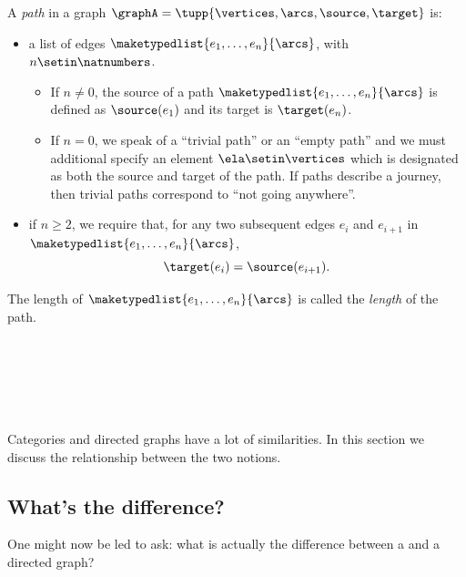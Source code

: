 \begin{ctdefinition}[Paths]
    \label{def:path}
    A \emph{path} in a graph $\graphA=\tupp{\vertices,\arcs, \source,\target}$ is:

    \constit

    \begin{itemize}
        \item a list of edges $\maketypedlist{e_1, \dots, e_n}{\arcs}$, with $n \setin \natnumbers$.
              \begin{itemize}
                  \item If $n \neq 0$, the source of a path $\maketypedlist{e_1, \dots, e_n}{\arcs}$ is defined as $\source(e_1)$ and its target is $\target(e_n)$.
                  \item If $n = 0$, we speak of a ``trivial path'' or an ``empty path'' and we must additional specify an element $\ela \setin \vertices$ which is designated as both the source and target of the path.
                        If paths describe a journey, then trivial paths correspond to ``not going anywhere''.
              \end{itemize}
    \end{itemize}

    \condit

    \begin{itemize}
        \item if $n \geq 2$, we require that, for any two subsequent edges $e_i$ and $e_{i+1}$ in $\maketypedlist{e_1, \dots, e_n}{\arcs}$,
              \begin{equation}
                  \target(e_i) = \source(e_{i+1}).
              \end{equation}
    \end{itemize}
    The length of $\maketypedlist{e_1, \dots, e_n}{\arcs}$ is called the \emph{length} of the path.
\end{ctdefinition}

\ 

\ 

\

Categories and directed graphs have a lot of similarities. In this section we discuss the relationship between the two notions. 

\subsection{What's the difference?}

One might now be led to ask: what is actually the difference between a  and a directed graph?

